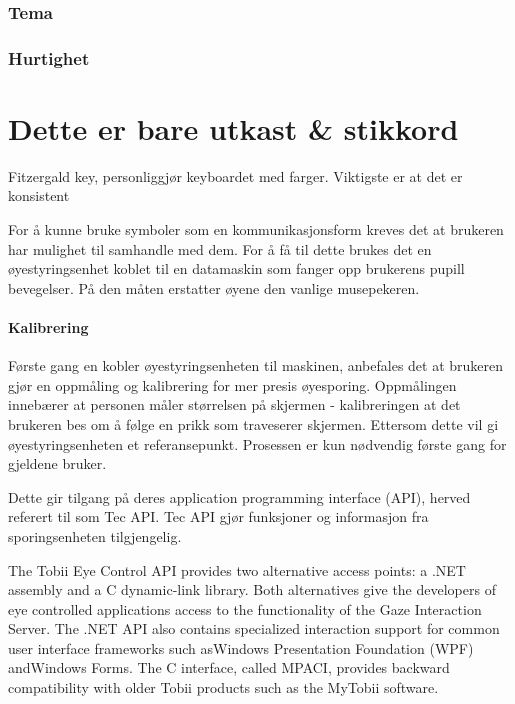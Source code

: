 \documentclass[phd,tocprelim]{cornell}
\begin{document}
\subsection{Tema}

\subsection{Hurtighet}









\chapter{Dette er bare utkast & stikkord}

Fitzergald key, personliggjør keyboardet med farger. Viktigste er at det er konsistent


For å kunne bruke symboler som en kommunikasjonsform kreves det at brukeren har mulighet til samhandle med dem. For å få til dette brukes det en øyestyringsenhet koblet til en datamaskin som fanger opp brukerens pupill bevegelser. På den måten erstatter øyene den vanlige musepekeren.

\subsubsection{Kalibrering}


Første gang en kobler øyestyringsenheten til maskinen, anbefales det at brukeren gjør en oppmåling og kalibrering for mer presis øyesporing. Oppmålingen innebærer at personen måler størrelsen på skjermen - kalibreringen at det brukeren bes om å følge en prikk som traveserer skjermen. Ettersom dette vil gi øyestyringsenheten et referansepunkt. Prosessen er kun nødvendig første gang for gjeldene bruker. 






Dette gir tilgang på deres application programming interface (API), herved referert til som Tec API. Tec API gjør funksjoner og informasjon fra sporingsenheten tilgjengelig. 


The Tobii Eye Control API provides two alternative access points: a .NET assembly and a C dynamic-link library. Both alternatives
give the developers of eye controlled applications access to the functionality of the Gaze Interaction Server. The .NET API also
contains specialized interaction support for common user interface frameworks such asWindows Presentation Foundation
(WPF) andWindows Forms. The C interface, called MPACI, provides backward compatibility with older Tobii products such as
the MyTobii software.
\end{document}
